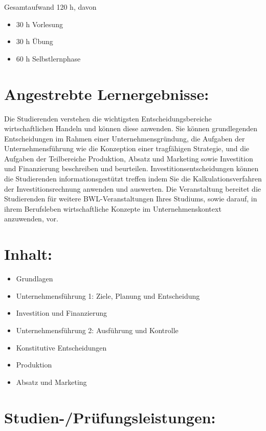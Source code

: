 Gesamtaufwand 120 h, davon

\begin{itemize}
\tightlist
\item
  30 h Vorlesung
\item
  30 h Übung
\item
  60 h Selbstlernphase
\end{itemize}

\section*{Angestrebte
Lernergebnisse:}\label{angestrebte-lernergebnisse-6}

Die Studierenden verstehen die wichtigsten Entscheidungsbereiche
wirtschaftlichen Handeln und können diese anwenden. Sie können
grundlegenden Entscheidungen im Rahmen einer Unternehmensgründung, die
Aufgaben der Unternehmensführung wie die Konzeption einer tragfähigen
Strategie, und die Aufgaben der Teilbereiche Produktion, Absatz und
Marketing sowie Investition und Finanzierung beschreiben und beurteilen.
Investitionsentscheidungen können die Studierenden informationsgestützt
treffen indem Sie die Kalkulationsverfahren der Investitionsrechnung
anwenden und auswerten. Die Veranstaltung bereitet die Studierenden für
weitere BWL-Veranstaltungen Ihres Studiums, sowie darauf, in ihrem
Berufsleben wirtschaftliche Konzepte im Unternehmenskontext anzuwenden,
vor.

\section*{Inhalt:}\label{inhalt-6}

\begin{itemize}
\tightlist
\item
  Grundlagen
\item
  Unternehmensführung 1: Ziele, Planung und Entscheidung
\item
  Investition und Finanzierung
\item
  Unternehmensführung 2: Ausführung und Kontrolle
\item
  Konstitutive Entscheidungen
\item
  Produktion
\item
  Absatz und Marketing
\end{itemize}

\section*{Studien-/Prüfungsleistungen:}\label{studien-pruxfcfungsleistungen-5}

